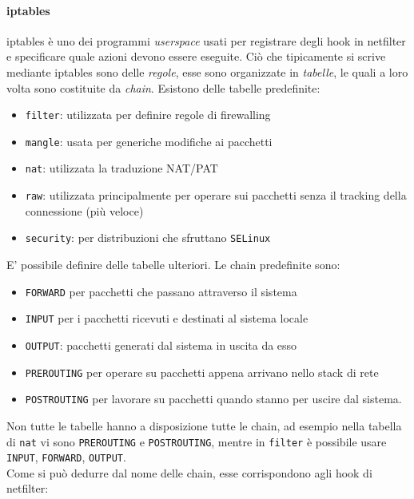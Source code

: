 \paragraph{iptables}
iptables è uno dei programmi \textit{userspace} usati per registrare degli hook in netfilter e
specificare quale azioni devono essere eseguite.  Ciò che tipicamente si scrive
mediante iptables sono delle \textit{regole}, esse sono organizzate in
\textit{tabelle}, le quali a loro volta sono costituite da \textit{chain}. Esistono delle
tabelle predefinite:
\begin{itemize}
  \item \texttt{filter}: utilizzata per definire regole di firewalling
  \item \texttt{mangle}: usata per generiche modifiche ai pacchetti
  \item \texttt{nat}: utilizzata la traduzione NAT/PAT
  \item \texttt{raw}: utilizzata principalmente per operare sui pacchetti senza
  il tracking della connessione (più veloce)
  \item \texttt{security}: per distribuzioni che sfruttano \texttt{SELinux}
\end{itemize}
E' possibile definire delle tabelle ulteriori.
Le chain predefinite sono:
\begin{itemize}
  \item \texttt{FORWARD} per pacchetti che passano attraverso
  il sistema
  \item \texttt{INPUT} per i pacchetti ricevuti e destinati al sistema locale
  \item \texttt{OUTPUT}: pacchetti generati dal sistema in uscita da esso
  \item \texttt{PREROUTING} per operare su pacchetti appena arrivano nello
  stack di rete
  \item \texttt{POSTROUTING} per lavorare su pacchetti quando stanno per uscire
  dal sistema.
\end{itemize}
Non tutte le tabelle hanno a disposizione tutte le chain, ad esempio nella tabella
di \texttt{nat} vi sono \texttt{PREROUTING} e \texttt{POSTROUTING}, mentre
in \texttt{filter} è possibile usare \texttt{INPUT}, \texttt{FORWARD}, \texttt{OUTPUT}.\\
Come si può dedurre dal nome delle chain, esse corrispondono agli hook di
netfilter:

